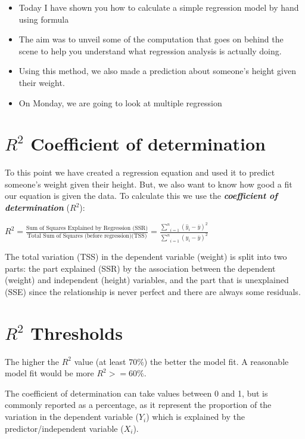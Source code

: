 \documentclass[
]{article}
\providecommand{\tightlist}{%
  \setlength{\itemsep}{0pt}\setlength{\parskip}{0pt}}
\begin{document}
\begin{itemize}
\tightlist
\item
  Today I have shown you how to calculate a simple regression model by
  hand using formula
\item
  The aim was to unveil some of the computation that goes on behind the
  scene to help you understand what regression analysis is actually
  doing.
\item
  Using this method, we also made a prediction about someone's height
  given their weight.
\item
  On Monday, we are going to look at multiple regression
\end{itemize}

\hypertarget{r2-coefficient-of-determination}{%
\section{\texorpdfstring{\(R^{2}\) Coefficient of
determination}{R\^{}\{2\} Coefficient of determination}}\label{r2-coefficient-of-determination}}

To this point we have created a regression equation and used it to
predict someone's weight given their height. But, we also want to know
how good a fit our equation is given the data. To calculate this we use
the \textbf{\emph{coefficient of determination}} (\(R^2\)):

\(R^2 = \frac{\text{Sum of Squares Explained by Regression (SSR)}}{\text{Total Sum of Squares (before regression)(TSS)}} = \frac{\underset{i=1}{\stackrel{n}{\sum}}(\hat{y}_{i} - \overline{y})^2}{\underset{i=1}{\stackrel{n}{\sum}}(y_{i} - \overline{y})^{2}}\)

The total variation (TSS) in the dependent variable (weight) is split
into two parts: the part explained (SSR) by the association between the
dependent (weight) and independent (height) variables, and the part that
is unexplained (SSE) since the relationship is never perfect and there
are always some residuals.

\hypertarget{r2-thresholds}{%
\section{\texorpdfstring{\(R^{2}\)
Thresholds}{R\^{}\{2\} Thresholds}}\label{r2-thresholds}}

The higher the \(R^{2}\) value (at least \(70\%\)) the better the model
fit. A reasonable model fit would be more \(R^{2} >= 60\%\).

The coefficient of determination can take values between 0 and 1, but is
commonly reported as a percentage, as it represent the proportion of the
variation in the dependent variable (\(Y_{i}\)) which is explained by
the predictor/independent variable (\(X_{i}\)).
\end{document}
